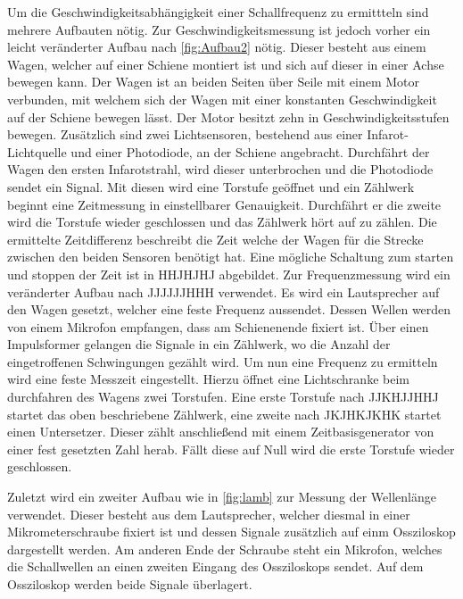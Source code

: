 Um die Geschwindigkeitsabhängigkeit einer Schallfrequenz zu ermittteln sind mehrere Aufbauten nötig.
  Zur Geschwindigkeitsmessung ist jedoch vorher ein leicht veränderter Aufbau nach \ref{fig:Aufbau2} nötig. Dieser besteht aus einem Wagen, welcher
   auf einer Schiene montiert ist und sich auf dieser in einer Achse bewegen kann.
 Der Wagen ist an beiden Seiten über Seile  mit einem Motor verbunden, mit welchem sich
  der Wagen mit einer konstanten Geschwindigkeit auf der Schiene bewegen lässt.
   Der Motor besitzt zehn in Geschwindigkeitsstufen bewegen.
Zusätzlich sind zwei Lichtsensoren, bestehend aus einer Infarot-Lichtquelle und
 einer Photodiode, an der Schiene angebracht.
    Durchfährt der Wagen
 den ersten Infarotstrahl, wird dieser unterbrochen und die Photodiode sendet ein Signal.
 Mit diesen wird eine Torstufe geöffnet und ein Zählwerk beginnt eine Zeitmessung in einstellbarer Genauigkeit. Durchfährt er die zweite wird die Torstufe wieder
  geschlossen und das Zählwerk hört auf zu zählen. Die ermittelte Zeitdifferenz beschreibt die Zeit welche der Wagen für die Strecke zwischen den beiden Sensoren benötigt hat.
    Eine mögliche Schaltung zum starten und stoppen der Zeit ist in HHJHJHJ abgebildet.
  Zur Frequenzmessung wird ein veränderter Aufbau nach JJJJJJHHH verwendet. Es wird ein Lautsprecher auf den Wagen gesetzt,
   welcher eine feste Frequenz aussendet. Dessen Wellen werden von einem Mikrofon empfangen, dass am
  Schienenende fixiert ist. Über einen Impulsformer gelangen die Signale in ein Zählwerk, wo die Anzahl der eingetroffenen Schwingungen gezählt wird.
   Um nun eine Frequenz zu ermitteln wird eine feste Messzeit eingestellt. Hierzu öffnet
   eine Lichtschranke beim durchfahren des Wagens zwei Torstufen. Eine erste Torstufe nach JJKHJJHHJ
    startet das oben beschriebene Zählwerk, eine zweite nach JKJHKJKHK startet einen Untersetzer.
     Dieser zählt anschließend mit einem Zeitbasisgenerator von einer fest gesetzten Zahl herab.
      Fällt diese auf Null wird die erste Torstufe wieder geschlossen.


       Zuletzt wird ein zweiter Aufbau wie in \ref{fig:lamb} zur Messung der Wellenlänge verwendet.
       Dieser besteht aus dem Lautsprecher, welcher diesmal in einer Mikrometerschraube fixiert
        ist und dessen Signale zusätzlich auf einm Ossziloskop dargestellt werden.
        Am anderen Ende der Schraube steht ein Mikrofon, welches die Schallwellen an einen zweiten Eingang
         des Ossziloskops sendet. Auf dem Ossziloskop werden beide Signale überlagert.
